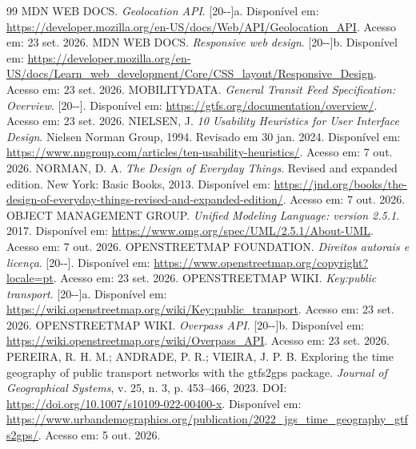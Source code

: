 \documentclass[12pt,oneside,a4paper,brazil,chapter=TITLE]{abntex2}
\begin{document}
\begin{thebibliography}{99}
 MDN WEB DOCS. \textit{Geolocation API}. [20\mbox{-}\mbox{-}]a. Disponível em: \url{https://developer.mozilla.org/en-US/docs/Web/API/Geolocation_API}. Acesso em: 23 set. 2026.
 MDN WEB DOCS. \textit{Responsive web design}. [20\mbox{-}\mbox{-}]b. Disponível em: \url{https://developer.mozilla.org/en-US/docs/Learn_web_development/Core/CSS_layout/Responsive_Design}. Acesso em: 23 set. 2026.
 MOBILITYDATA. \textit{General Transit Feed Specification: Overview}. [20\mbox{-}\mbox{-}]. Disponível em: \url{https://gtfs.org/documentation/overview/}. Acesso em: 23 set. 2026.
 NIELSEN, J. \textit{10 Usability Heuristics for User Interface Design}. Nielsen Norman Group, 1994. Revisado em 30 jan. 2024. Disponível em: \url{https://www.nngroup.com/articles/ten-usability-heuristics/}. Acesso em: 7 out. 2026.
 NORMAN, D. A. \textit{The Design of Everyday Things}. Revised and expanded edition. New York: Basic Books, 2013. Disponível em: \url{https://jnd.org/books/the-design-of-everyday-things-revised-and-expanded-edition/}. Acesso em: 7 out. 2026.
 OBJECT MANAGEMENT GROUP. \textit{Unified Modeling Language: version 2.5.1}. 2017. Disponível em: \url{https://www.omg.org/spec/UML/2.5.1/About-UML}. Acesso em: 7 out. 2026.
 OPENSTREETMAP FOUNDATION. \textit{Direitos autorais e licença}. [20\mbox{-}\mbox{-}]. Disponível em: \url{https://www.openstreetmap.org/copyright?locale=pt}. Acesso em: 23 set. 2026.
 OPENSTREETMAP WIKI. \textit{Key:public transport}. [20\mbox{-}\mbox{-}]a. Disponível em: \url{https://wiki.openstreetmap.org/wiki/Key:public_transport}. Acesso em: 23 set. 2026.
 OPENSTREETMAP WIKI. \textit{Overpass API}. [20\mbox{-}\mbox{-}]b. Disponível em: \url{https://wiki.openstreetmap.org/wiki/Overpass_API}. Acesso em: 23 set. 2026.
 PEREIRA, R. H. M.; ANDRADE, P. R.; VIEIRA, J. P. B. Exploring the time geography of public transport networks with the gtfs2gps package. \textit{Journal of Geographical Systems}, v. 25, n. 3, p. 453--466, 2023. DOI: \url{https://doi.org/10.1007/s10109-022-00400-x}. Disponível em: \url{https://www.urbandemographics.org/publication/2022_jgs_time_geography_gtfs2gps/}. Acesso em: 5 out. 2026.

\end{thebibliography}
\end{document}
